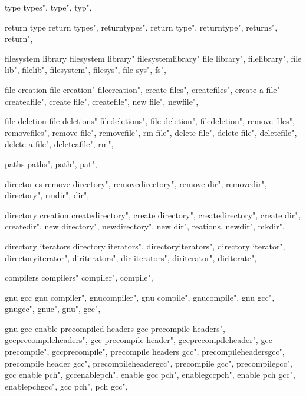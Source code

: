          type 
        types",  
        type",  
        typ",  
        
         return type 
        return types", 
        returntypes", 
        return type", 
        returntype", 
        returns", 
        return", 
        
         filesystem library
        filesystem library"
        filesystemlibrary"
        file library",
        filelibrary",
        file lib", 
        filelib",
        filesystem",
        filesys",
        file sys",
        fs",
         
         file creation 
        file creation"
        filecreation",
        create files",
        createfiles", 
        create a file"
        createafile",
        create file", 
        createfile",
        new file", 
        newfile", 
        
         file deletion 
        file deletions"
        filedeletions",
        file deletion",
        filedeletion", 
        remove files", 
        removefiles",
        remove file",
        removefile",
        rm file",
        delete file",
        delete file",
        deletefile",
        delete a file",
        deleteafile",
        rm",
        
         paths 
        paths", 
        path", 
        pat",
        
         directories
        remove directory",
        removedirectory",
        remove dir",
        removedir",
        directory",
        rmdir",
        dir",

         directory creation
        createdirectory",  
        create directory",  
        createdirectory",  
        create dir",  
        createdir",  
        new directory",  
        newdirectory",  
        new dir", reations. 
        newdir",  
        mkdir",  
        
         directory iterators 
        directory iterators",  
        directoryiterators",  
        directory iterator",  
        directoryiterator",  
        diriterators",  
        dir iterators",  
        diriterator",  
        diriterate",  
        
         compilers 
        compilers"
        compiler",
        compile",
        
         gnu gcc
        gnu compiler",
        gnucompiler",
        gnu compile",
        gnucompile",
        gnu gcc",
        gnugcc",
        gnuc",
        gnu",
        gcc",
        
         gnu gcc enable precompiled headers
        gcc precompile headers",  
        gccprecompileheaders",  
        gcc precompile header",  
        gccprecompileheader",  
        gcc precompile",  
        gccprecompile",  
        precompile headers gcc",  
        precompileheadersgcc",  
        precompile header gcc",  
        precompileheadergcc",  
        precompile gcc",  
        precompilegcc",  
        gcc enable pch",  
        gccenablepch",  
        enable gcc pch",  
        enablegccpch",  
        enable pch gcc",  
        enablepchgcc",  
        gcc pch",  
        pch gcc",  
        

